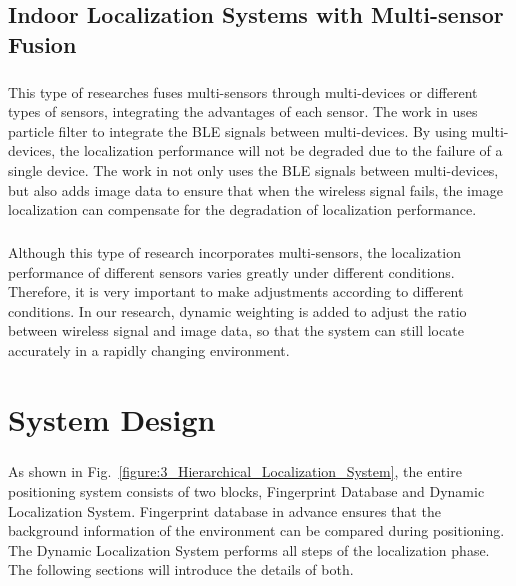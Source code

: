 \documentclass[a4paper,12pt]{report}
\begin{document}
\section{Indoor Localization Systems with Multi-sensor Fusion}

\paragraph{}
This type of researches fuses multi-sensors through multi-devices or different types of sensors, integrating the advantages of each sensor. The work in \cite{Sou2022JoLo} uses particle filter to integrate the BLE signals between multi-devices. By using multi-devices, the localization performance will not be degraded due to the failure of a single device. The work in \cite{Lin2021} not only uses the BLE signals between multi-devices, but also adds image data to ensure that when the wireless signal fails, the image localization can compensate for the degradation of localization performance.

\paragraph{}
Although this type of research incorporates multi-sensors, the localization performance of different sensors varies greatly under different conditions. Therefore, it is very important to make adjustments according to different conditions. In our research, dynamic weighting is added to adjust the ratio between wireless signal and image data, so that the system can still locate accurately in a rapidly changing environment.


\chapter{System Design}

\paragraph{}
As shown in Fig.~\ref{figure:3_Hierarchical_Localization_System}, the entire positioning system consists of two blocks, Fingerprint Database and Dynamic Localization System. Fingerprint database in advance ensures that the background information of the environment can be compared during positioning. The Dynamic Localization System performs all steps of the localization phase. The following sections will introduce the details of both.
%
\end{document}
